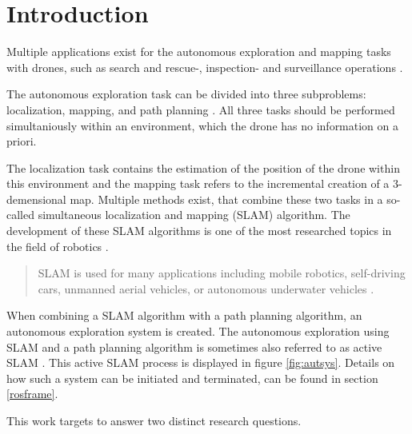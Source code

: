 \chapter{Introduction}

Multiple applications exist for the autonomous exploration and mapping tasks with drones,
 such as search and rescue-, inspection- and surveillance operations \cite{usecases}. 
 
 The autonomous exploration task can be divided into three subproblems: localization, mapping, and path planning \cite{accurat}. 
 All three tasks should be performed simultaniously within an environment, which the drone has no information on a priori. 
 
 The localization task contains the estimation of the position of the drone within this environment and the mapping task refers to 
 the incremental creation of a 3-demensional map. Multiple methods exist, that combine these two tasks in a so-called 
 simultaneous localization and mapping (SLAM) algorithm. The development of these SLAM algorithms is one of the most researched topics 
in the field of robotics \cite{slamintro}.

\begin{quote}
SLAM is used for many applications including mobile robotics, self-driving cars, unmanned
aerial vehicles, or autonomous underwater vehicles \cite{quote1}.
\end{quote}

 When combining a SLAM algorithm with a path planning algorithm, an autonomous exploration 
system is created. The autonomous exploration using SLAM and a path planning algorithm is sometimes also referred to as active SLAM \cite{inproceedings}. 
This active SLAM process is displayed in figure \ref{fig:autsys}. Details on how such a system can be initiated and terminated, can be found in section 
\ref{rosframe}.
 
 
This work targets to answer two distinct research questions. 
 
